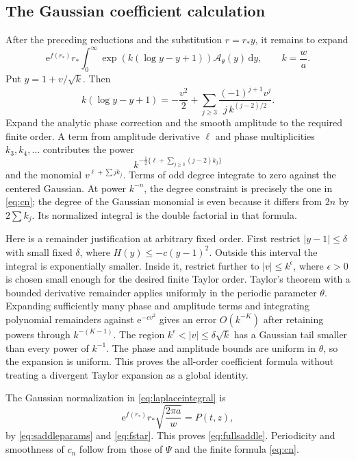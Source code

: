 \documentclass[11pt,oneside]{article}
\numberwithin{equation}{section}
\theoremstyle{definition}
\theoremstyle{remark}
\newcommand{\dd}{\,\mathrm d}
\newcommand{\e}{\mathrm e}
\begin{document}
\subsection{The Gaussian coefficient calculation}
After the preceding reductions and the substitution \(r=r_*y\), it remains
to expand
\begin{equation}
 \e^{f(r_*)}r_*
 \int_0^\infty\exp\left(k(\log y-y+1)\right)
                         \mathcal A_\theta(y)\dd y,
 \qquad k=\frac wa.
 \label{eq:laplaceintegral}
\end{equation}
Put \(y=1+v/\sqrt k\). Then
\begin{equation}
 k(\log y-y+1)
 =-\frac{v^2}{2}+
       \sum_{j\ge3}\frac{(-1)^{j+1}v^j}{j\,k^{(j-2)/2}}.
 \label{eq:phaseexpansion}
\end{equation}
Expand the analytic phase correction and the smooth amplitude to the required
finite order. A term from amplitude derivative \(\ell\) and phase
multiplicities \(k_3,k_4,\ldots\) contributes the power
\[
 k^{-\frac12\{\ell+\sum_{j\ge3}(j-2)k_j\}}
\]
and the monomial \(v^{\ell+\sum j k_j}\). Terms of odd degree integrate to
zero against the centered Gaussian. At power \(k^{-n}\), the degree constraint
is precisely the one in \eqref{eq:cn}; the degree of the Gaussian monomial is
even because it differs from \(2n\) by \(2\sum k_j\). Its normalized integral
is the double factorial in that formula.

Here is a remainder justification at arbitrary fixed order. First restrict
\(|y-1|\le\delta\) with small fixed \(\delta\), where \(H(y)\le-c(y-1)^2\).
Outside this interval the integral is exponentially smaller. Inside it,
restrict further to \(|v|\le k^\epsilon\), where \(\epsilon>0\) is chosen
small enough for the desired finite Taylor order. Taylor's theorem with a
bounded derivative remainder applies uniformly in the periodic parameter
\(\theta\). Expanding sufficiently many phase and amplitude terms and
integrating polynomial remainders against \(\e^{-c v^2}\) gives an error
\(O(k^{-K})\) after retaining powers through \(k^{-(K-1)}\). The region
\(k^\epsilon<|v|\le\delta\sqrt k\) has a Gaussian tail smaller than every
power of \(k^{-1}\). The phase and amplitude bounds are uniform in \(\theta\),
so the expansion is uniform. This proves the all-order coefficient formula
without treating a divergent Taylor expansion as a global identity.

The Gaussian normalization in \eqref{eq:laplaceintegral} is
\[
 \e^{f(r_*)}r_*\sqrt{\frac{2\pi a}{w}}=P(t,z),
\]
by \eqref{eq:saddleparams} and \eqref{eq:fstar}. This proves
\eqref{eq:fullsaddle}. Periodicity and smoothness of \(c_n\) follow from those
of \(\Psi\) and the finite formula \eqref{eq:cn}.
\end{document}
